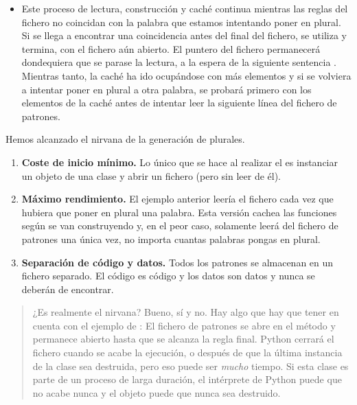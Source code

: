 \begin{itemize}
\item Este proceso de lectura, construcción y caché continua mientras las reglas del fichero no coincidan con la palabra que estamos intentando poner en plural. Si se llega a encontrar una coincidencia antes del final del fichero, se utiliza y termina, con el fichero aún abierto. El puntero del fichero permanecerá dondequiera que se parase la lectura, a la espera de la siguiente sentencia . Mientras tanto, la caché ha ido ocupándose con más elementos y si se volviera a intentar poner en plural a otra palabra, se probará primero con los elementos de la caché antes de intentar leer la siguiente línea del fichero de patrones.

\end{itemize}

Hemos alcanzado el nirvana de la generación de plurales.

\begin{enumerate}

\item \textbf{Coste de inicio mínimo.} Lo único que se hace al realizar el  es instanciar un objeto de una clase y abrir un fichero (pero sin leer de él).

\item \textbf{Máximo rendimiento.} El ejemplo anterior leería el fichero cada vez que hubiera que poner en plural una palabra. Esta versión cachea las funciones según se van construyendo y, en el peor caso, solamente leerá del fichero de patrones una única vez, no importa cuantas palabras pongas en plural.

\item \textbf{Separación de código y datos.} Todos los patrones se almacenan en un fichero separado. El código es código y los datos son datos y nunca se deberán de encontrar.

\end{enumerate}


\begin{quote}
¿Es realmente el nirvana? Bueno, sí y no. Hay algo que hay que tener en cuenta con el ejemplo de : El fichero de patrones se abre en el método  y permanece abierto hasta que se alcanza la regla final. Python cerrará el fichero cuando se acabe la ejecución, o después de que la última instancia de la clase  sea destruida, pero eso puede ser \emph{mucho} tiempo. Si esta clase es parte de un proceso de larga duración, el intérprete de Python puede que no acabe nunca y el objeto  puede que nunca sea destruido.
\end{quote}


